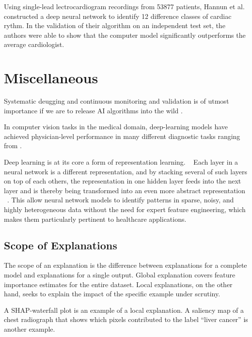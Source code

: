 Using single-lead lectrocardiogram recordings from \num{53877} patients,
Hannun et al.\autocite{hannunCardiologistlevel2019}
constructed a deep neural network
to identify 12 difference classes of cardiac rythm.
In the validation of their algorithm on an independent test set,
the authors were able to show that the computer model
significantly outperforms the average cardiologist. 



\section{Miscellaneous}

Systematic deugging and continuous monitoring and validation 
is of utmost importance if we are to release AI algorithms into the wild%
\autocite{topolHighperformance2019}.

In computer vision tasks in the medical domain,
deep-learning models have achieved physician-level performance
in many different diagnostic tasks
ranging from .


Deep learning is at its core a form of representation learning.
~\autocite{estevaGuide2019}
Each layer in a neural network is a different representation,
and by stacking several of such layers on top of each others,
the representation in one hidden layer
feeds into the next layer and
is thereby being transformed into an even more abstract representation%
~\autocite{estevaGuide2019}.
This allow neural network models to identify patterns in sparse, noisy,
and highly heterogeneous data without the need for expert feature engineering,
which makes them particularly pertinent to healthcare applications.%
~



\subsection{Scope of Explanations}

The scope of an explanation is the difference between
explanations for a complete model and
explanations for a single output.
Global explanation covers feature importance estimates 
for the entire dataset.
Local explanations, on the other hand, seeks to explain
the impact of the specific example under scrutiny.

A SHAP-waterfall plot is an example of a local explanation.
A saliency map of a chest radiograph that shows
which pixels contributed to the label \enquote{liver cancer}
is another example.

